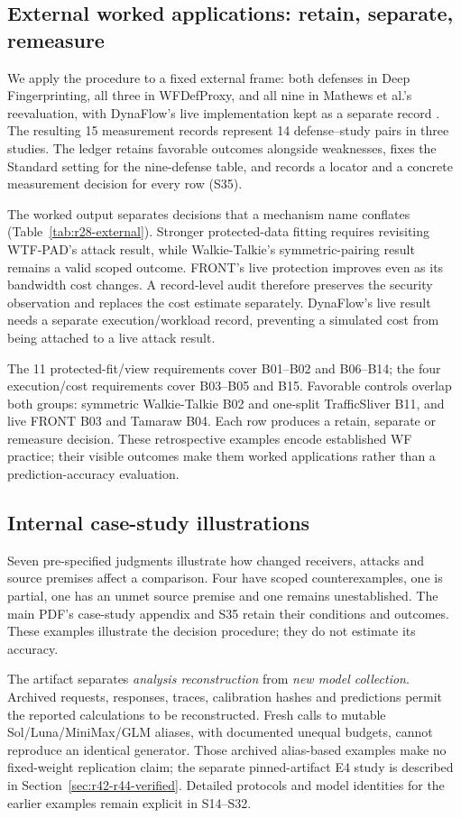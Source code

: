 \subsection{External worked applications: retain, separate, remeasure}\label{sec:utility-b}
We apply the procedure to a fixed external frame: both defenses in Deep Fingerprinting, all three in WFDefProxy, and all nine in Mathews et al.'s reevaluation, with DynaFlow's live implementation kept as a separate record \cite{sirinam2018deep,gong2021wfdefproxy,mathews2023critical}. The resulting 15 measurement records represent 14 defense--study pairs in three studies. The ledger retains favorable outcomes alongside weaknesses, fixes the Standard setting for the nine-defense table, and records a locator and a concrete measurement decision for every row (S35).

The worked output separates decisions that a mechanism name conflates (Table~\ref{tab:r28-external}). Stronger protected-data fitting requires revisiting WTF-PAD's attack result, while Walkie-Talkie's symmetric-pairing result remains a valid scoped outcome. FRONT's live protection improves even as its bandwidth cost changes. A record-level audit therefore preserves the security observation and replaces the cost estimate separately. DynaFlow's live result needs a separate execution/workload record, preventing a simulated cost from being attached to a live attack result.

The 11 protected-fit/view requirements cover B01--B02 and B06--B14; the four execution/cost requirements cover B03--B05 and B15. Favorable controls overlap both groups: symmetric Walkie-Talkie B02 and one-split TrafficSliver B11, and live FRONT B03 and Tamaraw B04. Each row produces a retain, separate or remeasure decision. These retrospective examples encode established WF practice; their visible outcomes make them worked applications rather than a prediction-accuracy evaluation.


\subsection{Internal case-study illustrations}\label{sec:utility-c}
Seven pre-specified judgments illustrate how changed receivers, attacks and source premises affect a comparison. Four have scoped counterexamples, one is partial, one has an unmet source premise and one remains unestablished. The main PDF's case-study appendix and S35 retain their conditions and outcomes. These examples illustrate the decision procedure; they do not estimate its accuracy.

The artifact separates \emph{analysis reconstruction} from \emph{new model collection}. Archived requests, responses, traces, calibration hashes and predictions permit the reported calculations to be reconstructed. Fresh calls to mutable Sol/Luna/MiniMax/GLM aliases, with documented unequal budgets, cannot reproduce an identical generator. Those archived alias-based examples make no fixed-weight replication claim; the separate pinned-artifact E4 study is described in Section~\ref{sec:r42-r44-verified}. Detailed protocols and model identities for the earlier examples remain explicit in S14--S32.
